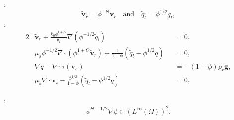 \documentclass[usenames,dvipsnames,letterpaper,landscape,final]{slides}
\begin{document}
\begin{myslide}
: 
\begin{equation}\label{eq:scaledVariables}
		  \tilde{\mathbf{v}}_r = \phi^{-\Theta}\mathbf{v}_r
	\quad\text{and}\quad
	\tilde{q}_l = \phi^{1/2}q_l,
\end{equation}
:
\begin{alignat}{2}
\label{eq:darcy_flow_sc}
		  &\tilde{\mathbf{v}}_r
		  + \frac{k_0\phi^{1+\Theta}}{\mu_l}\nabla(\phi^{-1/2}\tilde{q}_l)
        &&= 0,\\
\label{eq:consMass_flow_sc}
		  &\mu_s\phi^{-1/2}\nabla \cdot(\phi^{1+\Theta}\tilde{\mathbf{v}}_r)
        + \frac{1}{1-\phi}(\tilde{q}_l - \phi^{1/2}q) &&=0,\\
\label{eq:stokes_flow_sc}
		  &\nabla q - \nabla \cdot \tau(\mathbf{v}_s) &&= -(1-\phi)\rho_r \mathbf{g},\\
\label{eq:compaction_flow_sc}
		  &\mu_s\nabla \cdot \mathbf{v}_s
        - \frac{\phi^{1/2}}{1-\phi}(\tilde{q}_l - \phi^{1/2}q) &&=0,
\end{alignat}

\vspace{20pt}

:
\begin{equation}\label{eq:phiboundness}
		  \phi^{\Theta - 1/2} \nabla \phi \in (L^{\infty}(\Omega))^2.
\end{equation}

\end{myslide}
\end{document}
